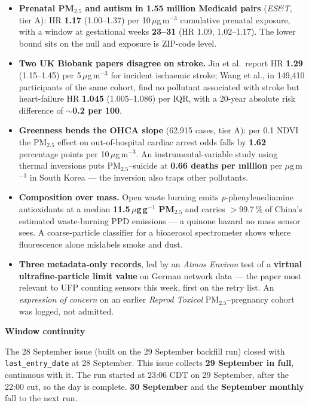 \documentclass[10pt]{article}
\begin{document}
\footnotesize
\begin{itemize}

\item \textbf{Prenatal PM$_{2.5}$ and autism in 1.55 million Medicaid pairs} (\textit{ES\&T}, tier A): HR
\textbf{1.17} (1.00--1.37) per 10\,$\mu$g\,m$^{-3}$ cumulative prenatal exposure, with a window at
gestational weeks \textbf{23--31} (HR 1.09, 1.02--1.17). The lower bound sits on the null and exposure is
ZIP-code level.

\item \textbf{Two UK Biobank papers disagree on stroke.} Jin et al.\ report HR \textbf{1.29} (1.15--1.45) per
5\,$\mu$g\,m$^{-3}$ for incident ischaemic stroke; Wang et al., in 149,410 participants of the same
cohort, find no pollutant associated with stroke but heart-failure HR \textbf{1.045} (1.005--1.086) per
IQR, with a 20-year absolute risk difference of $\sim$\textbf{0.2 per 100}.

\item \textbf{Greenness bends the OHCA slope} (62,915 cases, tier A): per 0.1 NDVI the PM$_{2.5}$ effect on
out-of-hospital cardiac arrest odds falls by \textbf{1.62} percentage points per 10\,$\mu$g\,m$^{-3}$.
An instrumental-variable study using thermal inversions puts PM$_{2.5}$--suicide at \textbf{0.66 deaths
per million} per $\mu$g\,m$^{-3}$ in South Korea --- the inversion also traps other pollutants.

\item \textbf{Composition over mass.} Open waste burning emits \textit{p}-phenylenediamine antioxidants at
a median \textbf{11.5\,$\mu$g\,g$^{-1}$ PM$_{2.5}$} and carries $>$99.7\,\% of China's estimated waste-burning
PPD emissions --- a quinone hazard no mass sensor sees. A coarse-particle classifier for a bioaerosol
spectrometer shows where fluorescence alone mislabels smoke and dust.

\item \textbf{Three metadata-only records}, led by an \textit{Atmos Environ} test of a \textbf{virtual
ultrafine-particle limit value} on German network data --- the paper most relevant to UFP counting
sensors this week, first on the retry list. An \textit{expression of concern} on an earlier
\textit{Reprod Toxicol} PM$_{2.5}$--pregnancy cohort was logged, not admitted.

\end{itemize}

\vspace{2mm}

\begin{keybox}
{\sffamily\bfseries\footnotesize\color{Deep}Window continuity}\\[1.2mm]
{\fontsize{7.2}{8.8}\selectfont
The 28 September issue (built on the 29 September backfill run) closed with
\texttt{last\_entry\_date} at 28 September. This issue collects \textbf{29 September in full},
continuous with it. The run started at 23:06 CDT on 29 September, after the 22:00 cut, so the day
is complete. \textbf{30 September} and the \textbf{September monthly} fall to the next run.\par}
\end{keybox}
\end{document}

